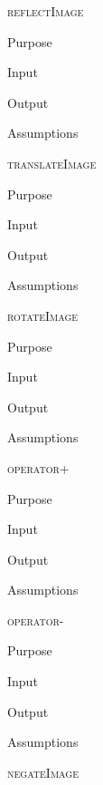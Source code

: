 \documentclass[pdftex, 11pt]{article}
\begin{document}
\begin{description}
	\item{\textsc{reflectImage}}
		\begin{description}
			\item{Purpose}


			\item{Input}


			\item{Output}


			\item{Assumptions}


		\end{description}


	\item{\textsc{translateImage}}
		\begin{description}
			\item{Purpose}


			\item{Input}


			\item{Output}


			\item{Assumptions}


		\end{description}


	\item{\textsc{rotateImage}}
		\begin{description}
			\item{Purpose}


			\item{Input}


			\item{Output}


			\item{Assumptions}


		\end{description}


	\item{\textsc{operator+}}
		\begin{description}
			\item{Purpose}


			\item{Input}


			\item{Output}


			\item{Assumptions}


		\end{description}


	\item{\textsc{operator-}}
		\begin{description}
			\item{Purpose}


			\item{Input}


			\item{Output}


			\item{Assumptions}


		\end{description}


	\item{\textsc{negateImage}}

\end{description}
\end{document}
